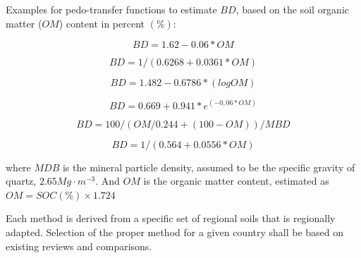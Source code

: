 \documentclass[10pt,b5paper,]{book}
\theoremstyle{definition}
\theoremstyle{definition}
\theoremstyle{definition}
\theoremstyle{remark}
\begin{document}
Examples for pedo-transfer functions to estimate \(BD\), based on the
soil organic matter (\(OM\)) content in percent \((\%)\):

\begin{equation}
BD = 1.62-0.06 * OM
\end{equation}

\cite{saini_1966_organic}

\begin{equation}
BD = 1/(0.6268 + 0.0361 * OM)
\end{equation}

\cite{Drew1973}

\begin{equation}
BD = 1.482 - 0.6786 * (log OM)
\end{equation}

\cite{jeffrey1970note}

\begin{equation}
BD = 0.669 + 0.941 * e^{(-0,06 * OM)}
\end{equation}

\cite{Grigal1989}

\begin{equation}
BD = 100/(OM/0.244 + (100-OM))/MBD
\end{equation}

\cite{adams1973effect}

\begin{equation}
BD = 1/(0.564 + 0.0556*OM)
\end{equation}

\cite{honeysett1989use}

where \(MDB\) is the mineral particle density, assumed to be the
specific gravity of quartz, \(2.65 Mg \cdot m^{-3}\). And \(OM\) is the
organic matter content, estimated as \(OM = SOC(\%) × 1.724\)

Each method is derived from a specific set of regional soils that is
regionally adapted. Selection of the proper method for a given country
shall be based on existing reviews and comparisons.
\end{document}
